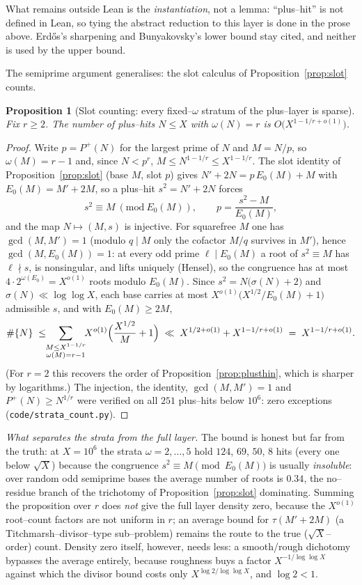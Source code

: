 \documentclass[11pt]{article}
\newtheorem{proposition}[theorem]{Proposition}
\theoremstyle{definition}
\begin{document}
What remains outside Lean is the \emph{instantiation}, not a lemma: ``plus--hit'' is not defined in
Lean, so tying the abstract reduction to this layer is done in the prose above. Erd\H{o}s's
sharpening and Bunyakovsky's lower bound stay cited, and neither is used by the upper bound.


The semiprime argument generalises: the slot calculus of Proposition~\ref{prop:slot} counts.

\begin{proposition}[Slot counting: every fixed--$\omega$ stratum of the plus--layer is sparse]\label{prop:strata}
Fix $r\ge2$. The number of plus--hits $N\le X$ with $\omega(N)=r$ is $O\bigl(X^{1-1/r+o(1)}\bigr)$.
\end{proposition}
\begin{proof}
Write $p=P^+(N)$ for the largest prime of $N$ and $M=N/p$, so $\omega(M)=r-1$ and, since $N<p^r$,
$M\le N^{1-1/r}\le X^{1-1/r}$. The slot identity of Proposition~\ref{prop:slot} (base $M$, slot $p$)
gives $N'+2N=p\,E_0(M)+M$ with $E_0(M)=M'+2M$, so a plus--hit $s^2=N'+2N$ forces
\[ s^2\equiv M\ (\mathrm{mod}\ E_0(M)),\qquad p=\frac{s^2-M}{E_0(M)}, \]
and the map $N\mapsto(M,s)$ is injective. For squarefree $M$ one has $\gcd(M,M')=1$ (modulo
$q\mid M$ only the cofactor $M/q$ survives in $M'$), hence $\gcd(M,E_0(M))=1$: at every odd prime
$\ell\mid E_0(M)$ a root of $s^2\equiv M$ has $\ell\nmid s$, is nonsingular, and lifts uniquely
(Hensel), so the congruence has at most $4\cdot2^{\omega(E_0)}=X^{o(1)}$ roots modulo $E_0(M)$.
Since $s^2=N\bigl(\sigma(N)+2\bigr)$ and $\sigma(N)\ll\log\log X$, each base carries at most
$X^{o(1)}\bigl(X^{1/2}/E_0(M)+1\bigr)$ admissible $s$, and with $E_0(M)\ge2M$,
\[ \#\{N\}\;\le\!\!\sum_{\substack{M\le X^{1-1/r}\\ \omega(M)=r-1}}\!\!X^{o(1)}\Bigl(\frac{X^{1/2}}{M}+1\Bigr)
\;\ll\;X^{1/2+o(1)}+X^{1-1/r+o(1)}\;=\;X^{1-1/r+o(1)}. \]
(For $r=2$ this recovers the order of Proposition~\ref{prop:plusthin}, which is sharper by
logarithms.) The injection, the identity, $\gcd(M,M')=1$ and $P^+(N)\ge N^{1/r}$ were verified on
all $251$ plus--hits below $10^6$: zero exceptions (\texttt{code/strata\_count.py}).
\end{proof}

\emph{What separates the strata from the full layer.} The bound is honest but far from the truth: at $X=10^6$ the strata $\omega=2,\dots,5$ hold
$124$, $69$, $50$, $8$ hits (every one below $\sqrt X$) because the congruence
$s^2\equiv M\pmod{E_0(M)}$ is usually \emph{insoluble}: over random odd semiprime bases the average
number of roots is $0.34$, the no--residue branch of the trichotomy of Proposition~\ref{prop:slot}
dominating. Summing the proposition over $r$ does \emph{not} give the full layer density zero,
because the $X^{o(1)}$ root--count factors are not uniform in $r$; an average bound for
$\tau(M'+2M)$ (a Titchmarsh--divisor--type sub--problem) remains the route to the true
($\sqrt X$--order) count. Density zero itself, however, needs less: a smooth/rough dichotomy
bypasses the average entirely, because roughness buys a factor $X^{-1/\log\log X}$ against which
the divisor bound costs only $X^{\log2/\log\log X}$, and $\log2<1$.
\end{document}
